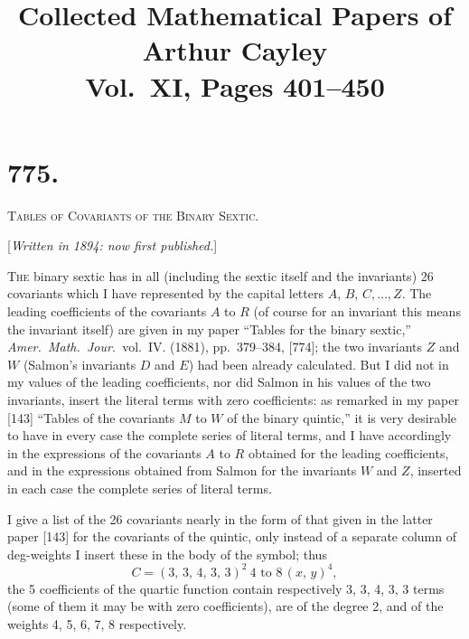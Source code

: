 \documentclass[11pt,a4paper]{article}
\title{\textbf{Collected Mathematical Papers of Arthur Cayley}\\[6pt]
\large Vol.~XI, Pages 401--450}
\author{}
\date{}
\theoremstyle{cayley}
\begin{document}
\maketitle
\thispagestyle{empty}

\section*{775.}

\begin{center}
\Large\scshape Tables of Covariants of the Binary Sextic.
\end{center}

\begin{center}
[\textit{Written in 1894: now first published.}]
\end{center}

\textsc{The} binary sextic has in all (including the sextic itself and the invariants) 26 covariants which I have represented by the capital letters $A$, $B$, $C,\dots, Z$. The leading coefficients of the covariants $A$ to $R$ (of course for an invariant this means the invariant itself) are given in my paper ``Tables for the binary sextic,'' \textit{Amer.\ Math.\ Jour.}\ vol.~IV. (1881), pp.~379--384, [774]; the two invariants $Z$ and $W$ (Salmon's invariants $D$ and $E$) had been already calculated. But I did not in my values of the leading coefficients, nor did Salmon in his values of the two invariants, insert the literal terms with zero coefficients: as remarked in my paper [143] ``Tables of the covariants $M$ to $W$ of the binary quintic,'' it is very desirable to have in every case the complete series of literal terms, and I have accordingly in the expressions of the covariants $A$ to $R$ obtained for the leading coefficients, and in the expressions obtained from Salmon for the invariants $W$ and $Z$, inserted in each case the complete series of literal terms.

I give a list of the 26 covariants nearly in the form of that given in the latter paper [143] for the covariants of the quintic, only instead of a separate column of deg-weights I insert these in the body of the symbol; thus
\[
C = (3,\, 3,\, 4,\, 3,\, 3)^{2}\ 4\text{ to }8\, (x,\, y)^{4},
\]
the 5 coefficients of the quartic function contain respectively 3, 3, 4, 3, 3 terms (some of them it may be with zero coefficients), are of the degree 2, and of the weights 4, 5, 6, 7, 8 respectively.
\end{document}
